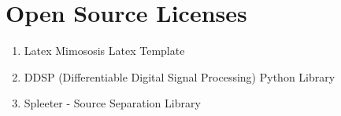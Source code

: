 \chapter{Open Source Licenses}
\label{chapter:open_source_licenses}

\begin{enumerate}
    \item Latex Mimososis Latex Template\cite{LatexMimosis}
    \item DDSP (Differentiable Digital Signal Processing) Python Library\cite{DDSPPip}
    \item Spleeter - Source Separation Library\cite{SpleeterPip}
\end{enumerate}